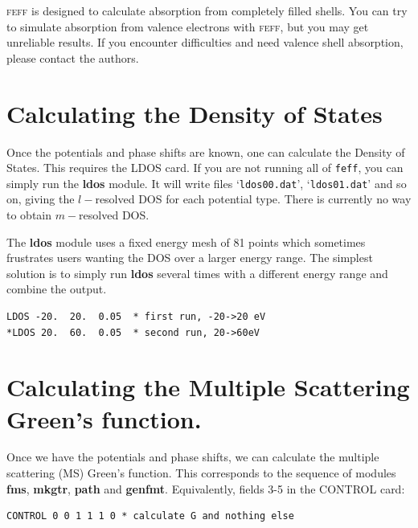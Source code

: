 \documentclass[11pt,oneside]{report} %
\newcommand{\program}[1]{\textsc{#1}}
\newcommand{\feff}{\program{feff}}
\newcommand{\file}[1]{`\texttt{#1}'}
\newcommand{\module}[1]{\textrm{\bf{#1}}}
\begin{document}
{\feff} is designed to calculate absorption from completely filled
shells. You can try to simulate absorption from valence electrons
with {\feff}, but you may get unreliable results. If you
encounter difficulties and need valence shell absorption, please
contact the authors.



\section{Calculating the Density of States}
Once the potentials and phase shifts are known, one can calculate the Density of States.  This requires the LDOS card.  If you are not
running all of \texttt{feff}, you can simply run the \module{ldos} module.  It will write files \file{ldos00.dat}, \file{ldos01.dat} and so on, giving
the $l-$resolved DOS for each potential type.  There is currently no way to obtain $m-$resolved DOS.

The \module{ldos} module uses a fixed energy mesh of 81 points which sometimes frustrates users wanting the DOS over a larger energy range.
The simplest solution is to simply run \module{ldos} several times with a different energy range and combine the output.
\begin{verbatim}
LDOS -20.  20.  0.05  * first run, -20->20 eV
*LDOS 20.  60.  0.05  * second run, 20->60eV
\end{verbatim}


\section{Calculating the Multiple Scattering Green's function.}


Once we have the potentials and phase shifts, we can calculate the multiple scattering (MS) Green's function.  This corresponds to the sequence of modules
\module{fms}, \module{mkgtr}, \module{path} and \module{genfmt}.  Equivalently, fields 3-5 in the CONTROL card:

\begin{verbatim}
CONTROL 0 0 1 1 1 0 * calculate G and nothing else
\end{verbatim}
\end{document}
